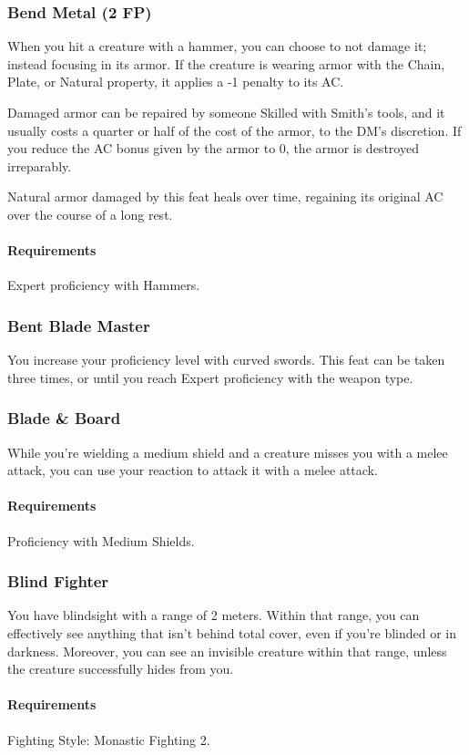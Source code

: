 \subsubsection{Bend Metal (2 FP)} \label{feat::bendmetal}
    When you hit a creature with a hammer, you can choose to not damage it; instead focusing in its armor.
    If the creature is wearing armor with the Chain, Plate, or Natural property, it applies a -1 penalty to its AC.

    Damaged armor can be repaired by someone Skilled with Smith's tools, and it usually costs a quarter or half of the cost of the armor, to the DM's discretion.
    If you reduce the AC bonus given by the armor to 0, the armor is destroyed irreparably.

    Natural armor damaged by this feat heals over time, regaining its original AC over the course of a long rest.
    \paragraph{Requirements} Expert proficiency with Hammers.
\subsubsection{Bent Blade Master} \label{feat::bentblademaster}
    You increase your proficiency level with curved swords.
    This feat can be taken three times, or until you reach Expert proficiency with the weapon type.
\subsubsection{Blade \& Board} \label{feat::bladeandboard}
    While you're wielding a medium shield and a creature misses you with a melee attack, you can use your reaction to attack it with a melee attack.
    \paragraph{Requirements} Proficiency with Medium Shields.
\subsubsection{Blind Fighter} \label{feat::blindfighter}
    You have blindsight with a range of 2 meters.
    Within that range, you can effectively see anything that isn't behind total cover, even if you're blinded or in darkness.
    Moreover, you can see an invisible creature within that range, unless the creature successfully hides from you.
    \paragraph{Requirements} Fighting Style: Monastic Fighting 2.
